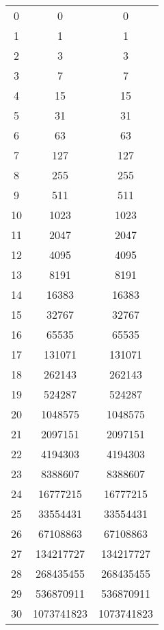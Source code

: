 \documentclass{article}
\begin{document}
\begin{table}[H]
\begin{center}
\begin{tabular}{c||c|c}
                0 & 0 & 0 \\
                1 & 1 & 1 \\
                2 & 3 & 3 \\
                3 & 7 & 7 \\
                4 & 15 & 15 \\
                5 & 31 & 31 \\
                6 & 63 & 63 \\
                7 & 127 & 127 \\
                8 & 255 & 255 \\
                9 & 511 & 511 \\
                10 & 1023 & 1023 \\
                11 & 2047 & 2047 \\
                12 & 4095 & 4095 \\
                13 & 8191 & 8191 \\
                14 & 16383 & 16383 \\
                15 & 32767 & 32767 \\
                16 & 65535 & 65535 \\
                17 & 131071 & 131071 \\
                18 & 262143 & 262143 \\
                19 & 524287 & 524287 \\
                20 & 1048575 & 1048575 \\
                21 & 2097151 & 2097151 \\
                22 & 4194303 & 4194303 \\
                23 & 8388607 & 8388607 \\
                24 & 16777215 & 16777215 \\
                25 & 33554431 & 33554431 \\
                26 & 67108863 & 67108863 \\
                27 & 134217727 & 134217727 \\
                28 & 268435455 & 268435455 \\
                29 & 536870911 & 536870911 \\
                30 & 1073741823 & 1073741823 \\
                
            \end{tabular}
        \end{center}
    \end{table}
\end{document}
